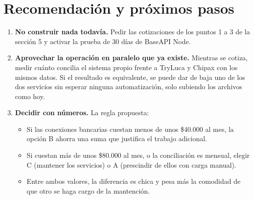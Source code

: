 \documentclass[11pt,a4paper]{article}
\begin{document}
\section{Recomendación y próximos pasos}

\begin{enumerate}
  \item \textbf{No construir nada todavía.} Pedir las cotizaciones de los puntos 1 a 3 de la sección 5 y activar la prueba de 30 días de BaseAPI Node.
  \item \textbf{Aprovechar la operación en paralelo que ya existe.} Mientras se cotiza, medir cuánto concilia el sistema propio frente a TryLuca y Chipax con los mismos datos. Si el resultado es equivalente, se puede dar de baja uno de los dos servicios sin esperar ninguna automatización, solo subiendo los archivos como hoy.
  \item \textbf{Decidir con números.} La regla propuesta:
  \begin{itemize}
    \item Si las conexiones bancarias cuestan menos de unos \$40.000 al mes, la opción B ahorra una suma que justifica el trabajo adicional.
    \item Si cuestan más de unos \$80.000 al mes, o la conciliación es mensual, elegir C (mantener los servicios) o A (prescindir de ellos con carga manual).
    \item Entre ambos valores, la diferencia es chica y pesa más la comodidad de que otro se haga cargo de la mantención.
  \end{itemize}
\end{enumerate}

\clearpage
\end{document}
